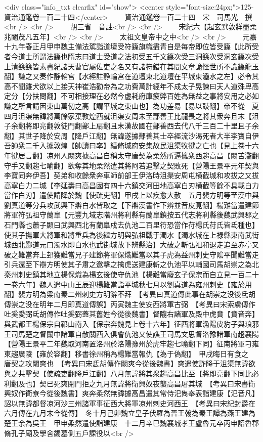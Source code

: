 <div class="info_txt clearfix" id="show">
<center style="font-size:24px;">125-資治通鑑卷一百二十四</center>
  　　資治通鑑卷一百二十四　宋　司馬光　撰<br />
<br />
　　胡三省　音註<br />
<br />
　　宋紀六【起玄黓敦牂盡柔兆閹茂凡五年】<br />
<br />
　　太祖文皇帝中之中<br />
<br />
　　元嘉十九年春正月甲申魏主備法駕詣道壇受符籙旗幟盡青自是每帝即位皆受籙【此所受者今道士所謂法籙也隋志曰道士受道之法初受五千文籙次受三洞籙次受洞玄籙次受上清籙籙皆素書紀諸天曹官屬佐吏之名又有諸符錯在其間文章詭怪世所不識籙龍玉翻】謙之又奏作静輪宫【水經註静輪宫在道壇東北道壇在平城東灅水之左】必令其高不聞雞犬欲以上接天神崔浩勸帝為之功費萬計經年不成太子晃諫曰天人道殊卑高定分【分扶問翻】不可相接理在必然今虚耗府庫疲弊百姓為無益之事將安用之必如謙之所言請因東山萬仞之高【謂平城之東山也】為功差易【易以豉翻】帝不從　夏四月沮渠無諱將萬餘家棄敦煌西就沮渠安周未至鄯善王比龍畏之將其衆奔且末【沮子余翻將即亮翻敦徒門翻鄯上扇翻且末漢故國在鄯善西去代八千三百二十里且子余翻】其世子降於安周【降戶江翻】無諱遂據鄯善其士卒經流沙渴死者大半李寶自伊吾帥衆二千入據敦煌【帥讀曰率】繕脩城府安集故民沮渠牧犍之亡也【見上卷十六年犍居言翻】凉州人闞爽據高昌自稱太守唐契為柔然所逼擁衆西趨高昌【闞苦濫翻守手又翻趨七喻翻】欲奪其地柔然遣其將阿若追擊之契敗死【營陽王景平元年契與李寶同奔伊吾】契弟和收餘衆奔車師前部王伊洛時沮渠安周屯横截城和攻拔之又拔高寧白力二城【李延壽曰高昌國有四十六鎮交河田地高寧白刃横截等餘不具載白力當作白刃】遣使請降於魏【使疏吏翻】甲戌上以疾愈大赦　五月裴方明等至漢中與劉真道等分兵攻武興下辯白水皆取之【下辯漢書作下辨並音皮莧翻】楊難當遣建節將軍符弘祖守蘭臯【元豐九域志階州將利縣有蘭臯鎮按五代志將利縣後魏武興郡之石門縣也蕭子顯曰武興西北有蘭臯戍去仇池二百里符恐當作苻楊氏苻氏皆氐種也】使其子撫軍大將軍和將重兵為後繼方明與弘祖戰于濁水【濁水城在上禄縣東南武街城西北酈道元曰濁水即白水也武街城故下辨縣治】大破之斬弘祖和退走追至赤亭又破之難當奔上邽獲難當兄子建節將軍保熾難當以其子虎為益州刺史守隂平聞難當走引兵還至下辯方明使其子肅之邀擊之擒虎送建康斬之仇池平以輔國司馬胡崇之為北秦州刺史鎮其地立楊保熾為楊玄後使守仇池【楊難當廢玄子保宗而自立見一百二十一卷六年】魏人遣中山王辰迎楊難當詣平城秋七月以劉真道為雍州刺史【雍於用翻】裴方明為梁南秦二州刺史方明辭不拜　【考異曰真道傳此事在胡崇之没後氐胡傳崇之没在明年二月即真道傳誤】丙寅魏主使安西將軍古弼　【考異曰宋索虜傳作吐奚愛弼氐胡傳作吐奚弼蓋其舊姓今從後魏書】督隴右諸軍及殿中虎賁【賁音奔】與武都王楊保宗自祁山南入【保宗奔魏見上卷十六年】征西將軍漁陽皮豹子與琅邪王司馬楚之督關中諸軍自散關西入俱會仇池又使譙王司馬文思督洛豫諸軍南趨襄陽【營陽王景平二年魏取河南置洛州於洛陽豫州於虎牢趨七喻翻下同】征南將軍刁雍東趨廣陵【雍於容翻】移書徐州稱為楊難當報仇【為于偽翻】　甲戌晦日有食之　唐契之攻闞爽也　【考異曰宋氐胡傳作闕爽今從後魏書】爽遣使詐降于沮渠無諱欲與之共擊契【使疏吏翻降戶江翻】八月無諱將其衆趨高昌比至【將即亮翻下同比必利翻及也】契已死爽閉門拒之九月無諱將衛興奴夜襲高昌屠其城　【考異曰宋書衛興奴作衛尞今從後魏書】爽奔柔然無諱據高昌遣其常侍汜雋奉表詣建康【汜音凡】詔以無諱都督凉河沙三州諸軍事征西大將軍凉州刺史河西王　【考異曰宋紀封爵在六月傳在九月末今從傳】　冬十月己卯魏立皇子伏羅為晉王翰為秦王譚為燕王建為楚王余為吳王　甲申柔然遣使詣建康　十二月辛巳魏襄城孝王盧魯元卒丙申詔魯郡脩孔子廟及學舍蠲墓側五戶課役以<br />
